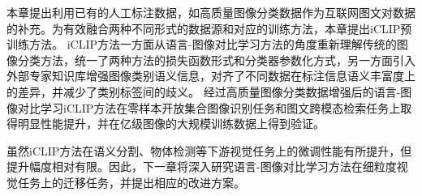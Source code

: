 本章提出利用已有的人工标注数据，如高质量图像分类数据作为互联网图文对数据的补充。为有效融合两种不同形式的数据源和对应的训练方法，本章提出iCLIP预训练方法。
iCLIP方法一方面从语言-图像对比学习方法的角度重新理解传统的图像分类方法，统一了两种方法的损失函数形式和分类器参数化方式，另一方面引入外部专家知识库增强图像类别语义信息，对齐了不同数据在标注信息语义丰富度上的差异，并减少了类别标签间的歧义。
经过高质量图像分类数据增强后的语言-图像对比学习iCLIP方法在零样本开放集合图像识别任务和图文跨模态检索任务上取得明显性能提升，并在亿级图像的大规模训练数据上得到验证。

虽然iCLIP方法在语义分割、物体检测等下游视觉任务上的微调性能有所提升，但提升幅度相对有限。因此，下一章将深入研究语言-图像对比学习方法在细粒度视觉任务上的迁移任务，并提出相应的改进方案。
